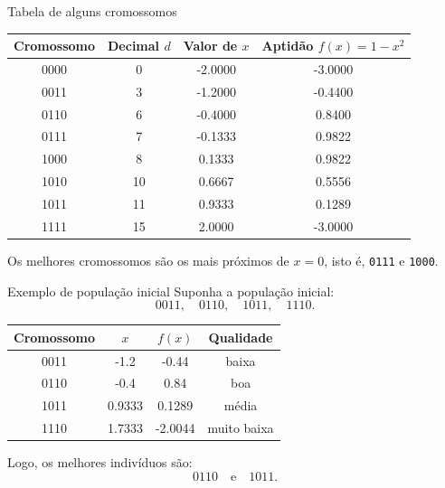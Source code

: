 \documentclass[mathserif, 10pt]{beamer}
\begin{document}
\begin{frame}{Tabela de alguns cromossomos}
	\small
	\begin{center}
		\begin{tabular}{cccc}
			\toprule
			Cromossomo & Decimal \(d\) & Valor de \(x\) & Aptidão \(f(x)=1-x^2\) \\
			\midrule
			0000 & 0  & -2.0000   & -3.0000 \\
			0011 & 3  & -1.2000   & -0.4400 \\
			0110 & 6  & -0.4000   & 0.8400 \\
			0111 & 7  & -0.1333   & 0.9822 \\
			1000 & 8  & 0.1333    & 0.9822 \\
			1010 & 10 & 0.6667    & 0.5556 \\
			1011 & 11 & 0.9333    & 0.1289 \\
			1111 & 15 & 2.0000    & -3.0000 \\
			\bottomrule
		\end{tabular}
	\end{center}
	
	\pause
	
	Os melhores cromossomos são os mais próximos de \(x=0\), isto é, \texttt{0111} e \texttt{1000}.
\end{frame}

\begin{frame}{Exemplo de população inicial}
	Suponha a população inicial:
	\[
	0011,\quad 0110,\quad 1011,\quad 1110.
	\]
	
	\pause
	
	\begin{center}
		\begin{tabular}{cccc}
			\toprule
			Cromossomo & \(x\) & \(f(x)\) & Qualidade \\
			\midrule
			0011 & -1.2    & -0.44   & baixa \\
			0110 & -0.4    & 0.84    & boa \\
			1011 & 0.9333  & 0.1289  & média \\
			1110 & 1.7333  & -2.0044 & muito baixa \\
			\bottomrule
		\end{tabular}
	\end{center}
	
	\pause
	
	Logo, os melhores indivíduos são:
	\[
	0110 \quad \text{e} \quad 1011.
	\]
\end{frame}
\end{document}
